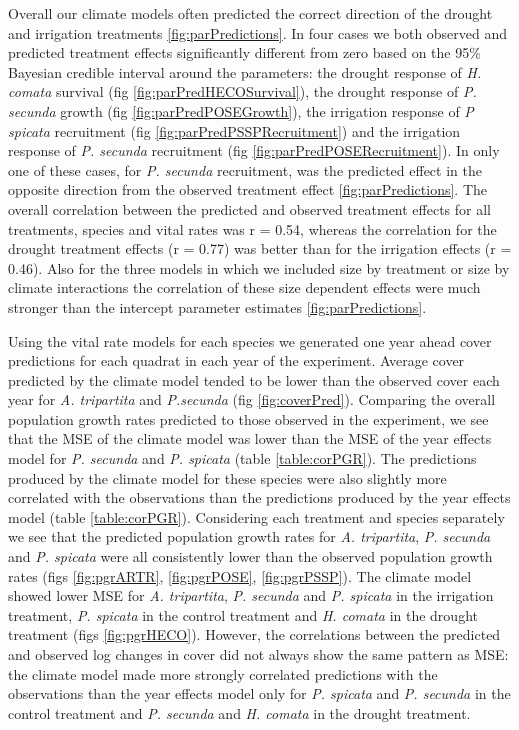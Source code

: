\documentclass[11pt]{article}
\begin{document}
\begin{doublespacing}
Overall our climate models often predicted the correct direction of the drought and irrigation treatments \ref{fig:parPredictions}. In four cases we both observed and predicted treatment effects significantly different from zero based on the 95\% Bayesian credible interval around the parameters: the drought response of \textit{H. comata} survival (fig \ref{fig:parPredHECOSurvival}), the drought response of \textit{P. secunda} growth (fig \ref{fig:parPredPOSEGrowth}), the irrigation response of \textit{P spicata} recruitment (fig \ref{fig:parPredPSSPRecruitment}) and the irrigation response of \textit{P. secunda} recruitment (fig \ref{fig:parPredPOSERecruitment}).  In only one of these cases, for \textit{P. secunda} recruitment, was the predicted effect in the opposite direction from the observed treatment effect \ref{fig:parPredictions}. The overall correlation between the predicted and observed treatment effects for all treatments, species and vital rates was r = 0.54, whereas the correlation for the drought treatment effects (r = 0.77) was better than for the irrigation effects (r = 0.46).  Also for the three models in which we included size by treatment or size by climate interactions the correlation of these size dependent effects were much stronger than the intercept parameter estimates \ref{fig:parPredictions}.  

Using the vital rate models for each species we generated one year ahead cover predictions for each quadrat in each year of the experiment.  Average cover predicted by the climate model tended to be lower than the observed cover each year for \textit{A. tripartita} and \textit{P.secunda} (fig \ref{fig:coverPred}). Comparing the overall population growth rates predicted to those observed in the experiment, we see that the MSE of the climate model was lower than the MSE of the year effects model for \textit{P. secunda} and \textit{P. spicata} (table \ref{table:corPGR}). The predictions produced by the climate model for these species were also slightly more correlated with the observations than the predictions produced by the year effects model (table \ref{table:corPGR}). Considering each treatment and species separately we see that the predicted population growth rates for \textit{A. tripartita}, \textit{P. secunda} and \textit{P. spicata} were all consistently lower than the observed population growth rates (figs \ref{fig:pgrARTR}, \ref{fig:pgrPOSE}, \ref{fig:pgrPSSP}). The climate model showed lower MSE for \textit{A. tripartita}, \textit{P. secunda} and \textit{P. spicata} in the irrigation treatment, \textit{P. spicata} in the control treatment and \textit{H. comata} in the drought treatment (figs \ref{fig:pgrHECO}).  However, the correlations between the predicted and observed log changes in cover did not always show the same pattern as MSE: the climate model made more strongly correlated predictions with the observations than the year effects model only for \textit{P. spicata} and \textit{P. secunda} in the control treatment and \textit{P. secunda} and \textit{H. comata} in the drought treatment. 
  


\end{doublespacing}
\end{document}
